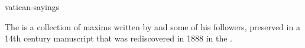 \documentclass{stex}
\begin{document}
\begin{smodule}{vatican-sayings}
\begin{sparagraph}[style=symdoc]
The  is a collection of maxims written by
 and some of his followers, preserved in a 14th century manuscript
that was rediscovered in 1888 in the .
\end{sparagraph}
\end{smodule}
\end{document}
